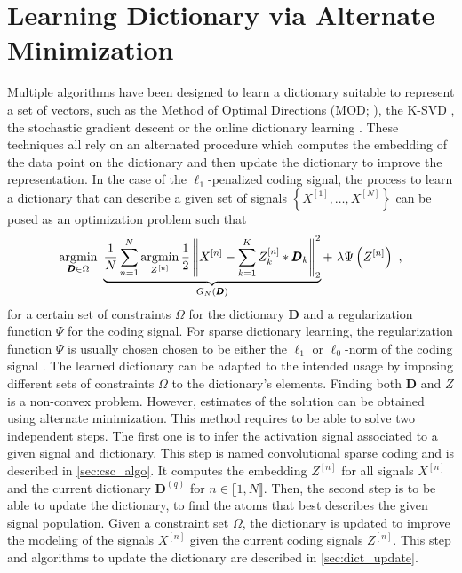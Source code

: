\documentclass[../thesis.tex]{subfiles}
\begin{document}
\section{Learning Dictionary via Alternate Minimization}
\label{sec:alternate_min}


	Multiple algorithms have been designed to learn a dictionary suitable to
	represent a set of vectors, such as the Method of Optimal Directions (MOD;
	\citealt{Engan1999}), the K-SVD \citep{Aharon2006}, the stochastic gradient
	descent \citep{Aharon2008} or the online dictionary learning \citep{Mairal2010}.
	These techniques all rely on an alternated procedure
	which computes the embedding of the data point on the dictionary and then
	update the dictionary to improve the representation. In the case of the
	$\ell_1$-penalized coding signal, the process to learn a dictionary that
	can describe a given set of signals $\left \{ X^{[1]}, \dots, X^{[N]} \right \}$
	can be posed as an optimization problem such that
	\begin{equation}
		\label{eq:dict_learn}
		\operatorname*{\arg\!\min}_{\pmb D\in \Omega}
			~\underbrace{\frac{1}{N}\sum_{n=1}^N \operatorname*{\arg\!\min}_{Z^{[n]}}
			\frac{1}{2} \left\|X^{[n]} - \sum_{k=1}^KZ^{[n]}_k* \pmb D_k\right\|_2^2}_{G_N(\pmb D)}
			+ ~\lambda\Psi\left(Z^{[n]}\right)~,
	\end{equation}
	for a certain set of constraints $\Omega$ for the dictionary $\pmb D$ and a regularization
	function $\Psi$ for the coding signal. For sparse dictionary learning, the regularization
	function $\Psi$ is usually chosen chosen to be either the $\ell_1$ or $\ell_0$-norm of
	the coding signal \citep{Grosse2007, Yellin2017}. The learned dictionary can be adapted
	to the intended usage by imposing different sets of constraints $\Omega$ 
	to the dictionary's elements. Finding both $\pmb D$ and $Z$ is a non-convex
	problem. However, estimates of the solution can be obtained using alternate
	minimization. This method requires to be able to solve two independent steps.
	The first one is to infer the
	activation signal associated to a given signal and dictionary. This step is
	named convolutional sparse coding and is described in \autoref{sec:csc_algo}.
	It computes the embedding $Z^{[n]}$ for all signals $X^{[n]}$ and the current
	dictionary $\pmb D^{(q)}$ for $n \in \llbracket 1, N\rrbracket$. 
	Then, the second step is to be able to update the dictionary, to find
	the atoms that best describes the given signal population. Given a constraint
	set $\Omega$, the dictionary is updated to improve the modeling of the signals
	$X^{[n]}$ given the current coding signals $Z^{[n]}$. This step and algorithms
	to update the dictionary are described in \autoref{sec:dict_update}.
\end{document}
